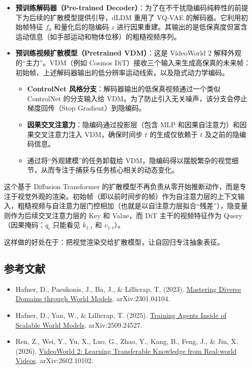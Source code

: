 \begin{itemize}
\tightlist
\item
  \textbf{预训练解码器（Pre-trained Decoder）}：为了在不干扰隐编码纯粹性的前提下为后续的扩散模型提供引导，dLDM 重用了 VQ-VAE 的解码器。它利用初始帧特征 \(f_0\) 和量化后的隐编码 \(z\) 进行因果重建。其输出的是低保真度但富含运动信息（如手部运动和物体位移）的粗糙视频序列。
\item
  \textbf{预训练视频扩散模型（Pretrained VDM）}：这是 VideoWorld 2 解释外观的``主力''。VDM（例如 Cosmos DiT）接收三个输入来生成高保真的未来帧：初始帧、上述解码器输出的低分辨率运动线索，以及隐式动力学编码。

  \begin{itemize}
  \tightlist
  \item
    \textbf{ControlNet 风格分支}：解码器输出的低保真视频通过一个类似 ControlNet 的分支输入给 VDM。为了防止引入无关噪声，该分支会停止梯度回传（Stop Gradient）到隐编码。
  \item
    \textbf{因果交叉注意力}：隐编码通过投影层（包含 MLP 和因果自注意力）和因果交叉注意力注入 VDM，确保时间步 \(t\) 的生成仅依赖于 \(t\) 及之前的隐编码信息。
  \item
    通过将``外观建模''的任务卸载给 VDM，隐编码得以摆脱繁杂的视觉细节，从而专注于捕获与任务核心相关的动态变化。
  \end{itemize}
\end{itemize}

这个基于 Diffusion Transformer 的扩散模型不再负责从零开始推断动作，而是专注于视觉外观的渲染。初始帧（即以前时间步的帧）作为自注意力层的上下文输入，粗糙视频与自注意力层门控相加（也就是以自注意力层拟合``残差''），隐变量则作为后续交叉注意力层的 Key 和 Value，而 DiT 主干的视频特征作为 Query（因果掩码：\(q_t\) 只能看见 \(k_{1:t}\) 和 \(v_{1:t}\)）。

这样做的好处在于：把视觉渲染交给扩散模型，让自回归专注抽象表征。

\hypertarget{ux53c2ux8003ux6587ux732e-185}{%
\subsection{参考文献}\label{ux53c2ux8003ux6587ux732e-185}}

\begin{itemize}
\tightlist
\item
  Hafner, D., Pasukonis, J., Ba, J., \& Lillicrap, T. (2023). \href{https://arxiv.org/abs/2301.04104}{Mastering Diverse Domains through World Models}. arXiv:2301.04104.
\item
  Hafner, D., Yan, W., \& Lillicrap, T. (2025). \href{https://arxiv.org/abs/2509.24527}{Training Agents Inside of Scalable World Models}. arXiv:2509.24527.
\item
  Ren, Z., Wei, Y., Yu, X., Luo, G., Zhao, Y., Kang, B., Feng, J., \& Jin, X. (2026). \href{https://arxiv.org/abs/2602.10102}{VideoWorld 2: Learning Transferable Knowledge from Real-world Videos}. arXiv:2602.10102.
\end{itemize}

